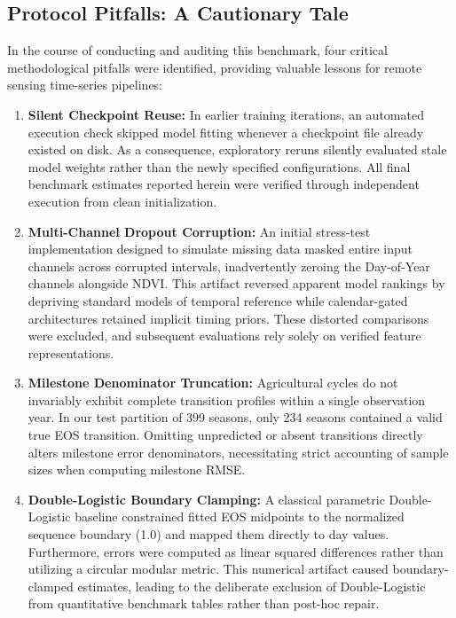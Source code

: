 \documentclass[runningheads]{llncs}
\begin{document}
\subsection{Protocol Pitfalls: A Cautionary Tale}
In the course of conducting and auditing this benchmark, four critical methodological pitfalls were identified, providing valuable lessons for remote sensing time-series pipelines:
\begin{enumerate}
    \item \textbf{Silent Checkpoint Reuse:} In earlier training iterations, an automated execution check skipped model fitting whenever a checkpoint file already existed on disk. As a consequence, exploratory reruns silently evaluated stale model weights rather than the newly specified configurations. All final benchmark estimates reported herein were verified through independent execution from clean initialization.
    \item \textbf{Multi-Channel Dropout Corruption:} An initial stress-test implementation designed to simulate missing data masked entire input channels across corrupted intervals, inadvertently zeroing the Day-of-Year channels alongside NDVI. This artifact reversed apparent model rankings by depriving standard models of temporal reference while calendar-gated architectures retained implicit timing priors. These distorted comparisons were excluded, and subsequent evaluations rely solely on verified feature representations.
    \item \textbf{Milestone Denominator Truncation:} Agricultural cycles do not invariably exhibit complete transition profiles within a single observation year. In our test partition of 399 seasons, only 234 seasons contained a valid true EOS transition. Omitting unpredicted or absent transitions directly alters milestone error denominators, necessitating strict accounting of sample sizes when computing milestone RMSE.
    \item \textbf{Double-Logistic Boundary Clamping:} A classical parametric Double-Logistic baseline constrained fitted EOS midpoints to the normalized sequence boundary (1.0) and mapped them directly to day values. Furthermore, errors were computed as linear squared differences rather than utilizing a circular modular metric. This numerical artifact caused boundary-clamped estimates, leading to the deliberate exclusion of Double-Logistic from quantitative benchmark tables rather than post-hoc repair.
\end{enumerate}
\end{document}
